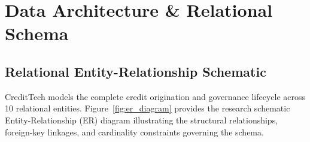 \chapter{Data Architecture \& Relational Schema}
\label{chap:data_architecture}

\section{Relational Entity-Relationship Schematic}
CreditTech models the complete credit origination and governance lifecycle across 10 relational entities. Figure~\ref{fig:er_diagram} provides the research schematic Entity-Relationship (ER) diagram illustrating the structural relationships, foreign-key linkages, and cardinality constraints governing the schema.

